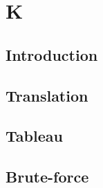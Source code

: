 \chapter{K}

\section{Introduction}

\section{Translation}

\section{Tableau}

\section{Brute-force}
